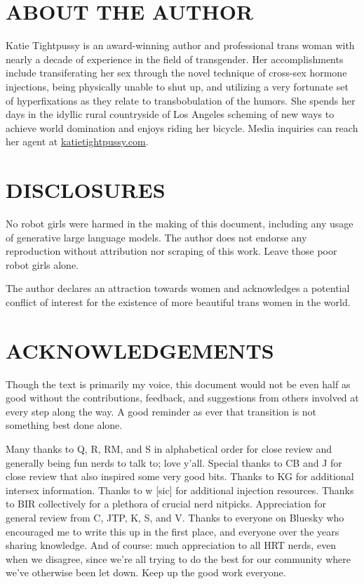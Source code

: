 \documentclass{article}
\begin{document}
\section*{ABOUT THE AUTHOR}

Katie Tightpussy is an award-winning author and professional trans woman with nearly a decade of experience in the field of transgender. Her accomplishments include transiferating her sex through the novel technique of cross-sex hormone injections, being physically unable to shut up, and utilizing a very fortunate set of hyperfixations as they relate to transbobulation of the humors. She spends her days in the idyllic rural countryside of Los Angeles scheming of new ways to achieve world domination and enjoys riding her bicycle. Media inquiries can reach her agent at \href{http://katietightpussy.com}{katietightpussy.com}.

 

\section*{DISCLOSURES}

No robot girls were harmed in the making of this document, including any usage of generative large language models. The author does not endorse any reproduction without attribution nor scraping of this work. Leave those poor robot girls alone.

The author declares an attraction towards women and acknowledges a potential conflict of interest for the existence of more beautiful trans women in the world.

 

\section*{ACKNOWLEDGEMENTS}

Though the text is primarily my voice, this document would not be even half as good without the contributions, feedback, and suggestions from others involved at every step along the way. A good reminder as ever that transition is not something best done alone.

Many thanks to Q, R, RM, and S in alphabetical order for close review and generally being fun nerds to talk to; love y’all. Special thanks to CB and J for close review that also inspired some very good bits. Thanks to KG for additional intersex information. Thanks to w [sic] for additional injection resources. Thanks to BIR collectively for a plethora of crucial nerd nitpicks. Appreciation for general review from C, JTP, K, S, and V. Thanks to everyone on Bluesky who encouraged me to write this up in the first place, and everyone over the years sharing knowledge. And of course: much appreciation to all HRT nerds, even when we disagree, since we’re all trying to do the best for our community where we’ve otherwise been let down. Keep up the good work everyone. 
\end{document}
